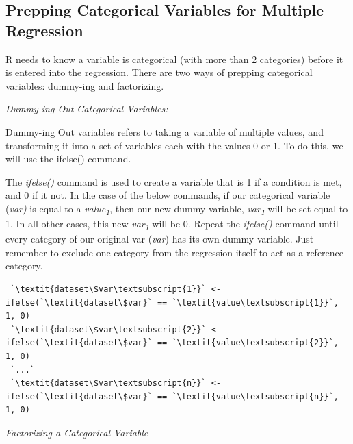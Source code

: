 \documentclass[12pt,letterpaper]{article}
\begin{document}
\subsection{Prepping Categorical Variables for Multiple Regression}

R needs to know a variable is categorical (with more than 2 categories) before it is entered into the regression.
There are two ways of prepping categorical variables: dummy-ing and factorizing.\vspace{.5em}
\vspace{1.5em}

\emph{Dummy-ing Out Categorical Variables:}

\vspace{.5em}
Dummy-ing Out variables refers to taking a variable of multiple values, and transforming it into a set of variables each with the values 0 or 1. To do this, we will use the ifelse() command.

\vspace{.5em}
The \emph{ifelse()} command is used to create a variable that is 1 if a condition is met, and 0 if it not. In the case of the below commands, if our categorical variable (\textit{var)} is equal to a \textit{value\textsubscript{1}}, then our new dummy variable, \textit{var\textsubscript{1}} will be set equal to 1. In all other cases, this new \textit{var\textsubscript{1}} will be 0.
Repeat the \emph{ifelse()} command until every category of our original var (\textit{var}) has its own dummy variable. Just remember to exclude one category from the regression itself to act as a reference category.

\begin{tcolorbox}[title = Prepping Categorical Dependent Variables for Multiple Regression (Dummy-ing)]
\begin{lstlisting}
 `\textit{dataset\$var\textsubscript{1}}` <- ifelse(`\textit{dataset\$var}` == `\textit{value\textsubscript{1}}`, 1, 0)
 `\textit{dataset\$var\textsubscript{2}}` <- ifelse(`\textit{dataset\$var}` == `\textit{value\textsubscript{2}}`, 1, 0)
 `...`
 `\textit{dataset\$var\textsubscript{n}}` <- ifelse(`\textit{dataset\$var}` == `\textit{value\textsubscript{n}}`, 1, 0)
\end{lstlisting}
\end{tcolorbox}

\vspace{1em}
\emph{Factorizing a Categorical Variable}\\
\end{document}

